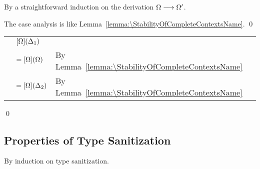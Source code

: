 \begin{lemma}[\FinishingCompletionsName]
  \label{lemma:\FinishingCompletionsName}
  \FinishingCompletionsBody
\end{lemma}
\proof

By a straightforward induction on the derivation $\Omega \longrightarrow \Omega'$.

The case analysis is like
Lemma~\ref{lemma:\StabilityOfCompleteContextsName}.
\qed

\begin{lemma}[\ConfluenceOfCompletenessName]
  \label{lemma:\ConfluenceOfCompletenessName}
  \ConfluenceOfCompletenessBody
\end{lemma}
\proof

\mbox{} %

\begin{longtable}[l]{lll}
  & $[\Omega](\Delta_1) $
  & \\
  & $= [\Omega](\Omega) $
  & By Lemma~\ref{lemma:\StabilityOfCompleteContextsName} \\
  & $= [\Omega](\Delta_2) $
  & By Lemma~\ref{lemma:\StabilityOfCompleteContextsName} \\
\end{longtable}
\qed

\subsection{Properties of Type Sanitization}

\begin{lemma}[\TypeSanitizationExtensionName]
  \label{lemma:\TypeSanitizationExtensionName}
  \TypeSanitizationExtensionBody
\end{lemma}
\proof

By induction on type sanitization.

